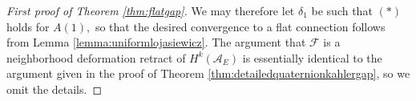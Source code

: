 \documentclass[12pt]{amsart}
\renewcommand{\1}{{\mathbf 1}}
\theoremstyle{others}
\numberwithin{equation}{section}
\begin{document}
\begin{proof}[First proof of Theorem \ref{thm:flatgap}]
We may therefore let $\delta_1$ be such that $(\ast)$ holds for $A(1),$ so that the desired convergence to a flat connection follows from Lemma \ref{lemma:uniformlojasiewicz}. The argument that $\mathcal{F}$ is a neighborhood deformation retract of \(H^k(\mathcal{A}_E)\) is essentially identical to the argument given in the proof of Theorem \ref{thm:detailedquaternionkahlergap}, so we omit the details.

\end{proof}
\end{document}
